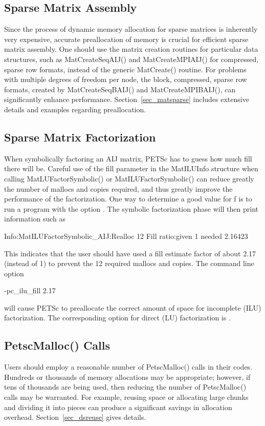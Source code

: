 {{\subsection{Sparse Matrix Assembly}

Since the process of dynamic memory allocation for sparse matrices is
inherently very expensive, accurate preallocation of memory is crucial
for efficient sparse matrix assembly.  One should use the matrix creation
routines for particular data structures, such as MatCreateSeqAIJ() and MatCreateMPIAIJ() for compressed, sparse
row formats, instead of the generic MatCreate() routine.  For
problems with multiple degrees of freedom per node, the block,
compressed, sparse row formats, created by MatCreateSeqBAIJ()
and MatCreateMPIBAIJ(), can significantly enhance performance.
Section~\ref{sec_matsparse} includes extensive details and
examples regarding preallocation.

\subsection{Sparse Matrix Factorization}
\label{sec_symbolfactor}

When symbolically factoring an AIJ matrix, PETSc has to guess
how much fill there will be.  Careful use of the fill parameter in the 
MatILUInfo structure 
when calling MatLUFactorSymbolic() or MatILUFactorSymbolic()
can reduce greatly the number of mallocs and copies required, and thus
greatly improve the performance of the factorization.  One way to
determine a good value for f is to run a program with the option .
The symbolic factorization phase will then print information such as
\begin{tabbing}
   Info:MatILUFactorSymbolic\_AIJ:Realloc 12 Fill ratio:given 1 needed 2.16423
\end{tabbing}
This indicates that the user should have used a fill estimate factor of
about 2.17 (instead of 1) to prevent the 12 required mallocs and copies.
The command line option   
\begin{tabbing}
    -pc\_ilu\_fill 2.17
\end{tabbing}
will cause PETSc to preallocate the correct amount of space for incomplete
(ILU) factorization.  The corresponding option for direct (LU) factorization
is  .

\subsection{PetscMalloc() Calls}
Users should employ a reasonable number of PetscMalloc() calls in their codes.
Hundreds or thousands of memory allocations may be appropriate; however, if tens of 
thousands are being used, then reducing the number of PetscMalloc() calls
may be warranted.  For example, reusing space or allocating large chunks 
and dividing it into pieces can produce a significant savings in 
allocation overhead.  Section~\ref{sec_dsreuse} gives details.

}}

